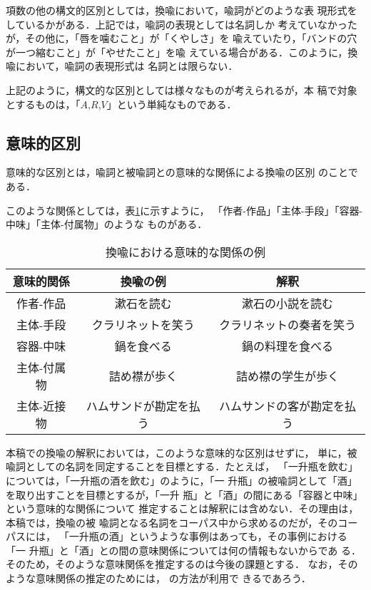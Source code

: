 項数の他の構文的区別としては，換喩において，喩詞がどのような表
現形式をしているかがある．上記では，喩詞の表現としては名詞しか
考えていなかったが，その他に，「唇を噛むこと」が「くやしさ」を
喩えていたり，「バンドの穴が一つ縮むこと」が「やせたこと」を喩
えている場合がある．このように，換喩において，喩詞の表現形式は
名詞とは限らない．

上記のように，構文的な区別としては様々なものが考えられるが，本
稿で対象とするものは，「$A$,$R$,$V$」という単純なものである．

\subsection{意味的区別}

意味的な区別とは，喩詞と被喩詞との意味的な関係による換喩の区別
のことである．

このような関係としては，表\ref{tab:metonymies}に示すように，
「作者-作品」「主体-手段」「容器-中味」「主体-付属物」のような
ものがある\cite{yamanashi88}．

\begin{table}[htbp]
  \begin{center}
    
    \caption{換喩における意味的な関係の例}
    
    \begin{tabular}{|c|c|c|}
      \hline
      意味的関係 & 換喩の例 & 解釈 \\ \hline
      作者-作品 & 漱石を読む & 漱石の小説を読む\\
      主体-手段 & クラリネットを笑う & クラリネットの奏者を笑う \\
      容器-中味 & 鍋を食べる & 鍋の料理を食べる\\
      主体-付属物 & 詰め襟が歩く & 詰め襟の学生が歩く\\
      主体-近接物 & ハムサンドが勘定を払う & ハムサンドの客が勘定を払う\\\hline
    \end{tabular}
    \label{tab:metonymies}
  \end{center}
\end{table}

本稿での換喩の解釈においては，このような意味的な区別はせずに，
単に，被喩詞としての名詞を同定することを目標とする．たとえば，
「一升瓶を飲む」については，「一升瓶の酒を飲む」のように，「一
升瓶」の被喩詞として「酒」を取り出すことを目標とするが，「一升
瓶」と「酒」の間にある「容器と中味」という意味的な関係について
推定することは解釈には含めない．その理由は，本稿では，換喩の被
喩詞となる名詞をコーパス中から求めるのだが，そのコーパスには，
「一升瓶の酒」というような事例はあっても，その事例における「一
升瓶」と「酒」との間の意味関係については何の情報もないからであ
る．そのため，そのような意味関係を推定するのは今後の課題とする．
なお，そのような意味関係の推定のためには，
\cite{kurohashi99:_seman_analy_japan_noun_phras}の方法が利用で
きるであろう．

